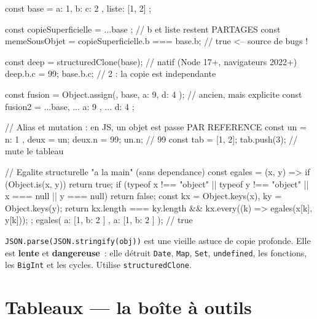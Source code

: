 \begin{codejs}
const base = { a: 1, b: { c: 2 }, liste: [1, 2] };

const copieSuperficielle = { ...base };            // b et liste restent PARTAGES
const memeSousObjet = copieSuperficielle.b === base.b;   // true  <-- source de bugs !

const deep = structuredClone(base);                // natif (Node 17+, navigateurs 2022+)
deep.b.c = 99; base.b.c;                            // 2 : la copie est independante

const fusion = Object.assign({}, base, { a: 9, d: 4 });  // ancien, mais explicite
const fusion2 = { ...base, ...{ a: 9 }, ...{ d: 4 } };

// Alias et mutation : en JS, un objet est passe PAR REFERENCE
const un = { n: 1 }, deux = un; deux.n = 99; un.n;   // 99
const tab = [1, 2]; tab.push(3);                       // mute le tableau

// Egalite structurelle "a la main" (sans dependance)
const egales = (x, y) => {
  if (Object.is(x, y)) return true;
  if (typeof x !== "object" || typeof y !== "object" || x === null || y === null) return false;
  const kx = Object.keys(x), ky = Object.keys(y);
  return kx.length === ky.length && kx.every((k) => egales(x[k], y[k]));
};
egales({ a: [1, { b: 2 }] }, { a: [1, { b: 2 }] });   // true
\end{codejs}

\begin{piege}
\verb|JSON.parse(JSON.stringify(obj))| est une vieille astuce de copie profonde. Elle est
\textbf{lente} et \textbf{dangereuse}~: elle d\'etruit \verb|Date|, \verb|Map|, \verb|Set|,
\verb|undefined|, les fonctions, les \verb|BigInt| et les cycles. Utilise \verb|structuredClone|.
\end{piege}

\section{Tableaux --- la bo\^ite \`a outils}

